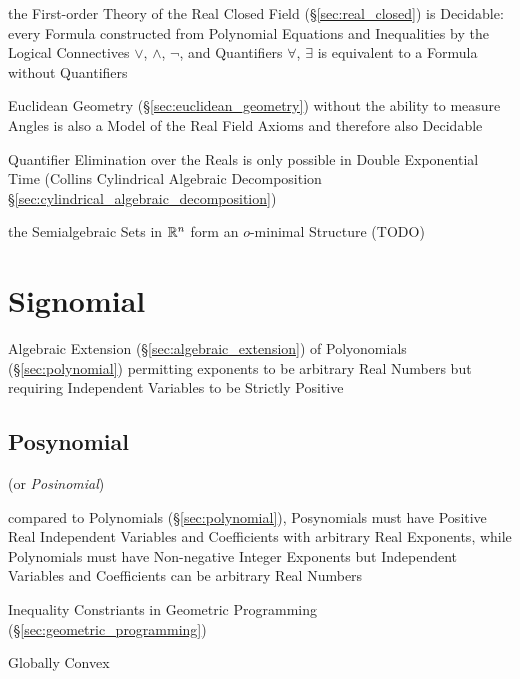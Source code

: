 the First-order Theory of the Real Closed Field (\S\ref{sec:real_closed}) is
Decidable: every Formula constructed from Polynomial Equations and Inequalities
by the Logical Connectives $\vee$, $\wedge$, $\neg$, and Quantifiers $\forall$,
$\exists$ is equivalent to a Formula without Quantifiers

Euclidean Geometry (\S\ref{sec:euclidean_geometry}) without the ability to
measure Angles is also a Model of the Real Field Axioms and therefore also
Decidable

Quantifier Elimination over the Reals is only possible in Double Exponential
Time (Collins Cylindrical Algebraic Decomposition
\S\ref{sec:cylindrical_algebraic_decomposition})

the Semialgebraic Sets in $\mathbb{R}^n$ form an $o$-minimal Structure (TODO)



\section{Signomial}\label{sec:signomial}

Algebraic Extension (\S\ref{sec:algebraic_extension}) of Polyonomials
(\S\ref{sec:polynomial}) permitting exponents to be arbitrary Real Numbers but
requiring Independent Variables to be Strictly Positive



\subsection{Posynomial}\label{sec:posynomial}

(or \emph{Posinomial})

compared to Polynomials (\S\ref{sec:polynomial}), Posynomials must have Positive
Real Independent Variables and Coefficients with arbitrary Real Exponents, while
Polynomials must have Non-negative Integer Exponents but Independent Variables
and Coefficients can be arbitrary Real Numbers

Inequality Constriants in Geometric Programming
(\S\ref{sec:geometric_programming})

Globally Convex



